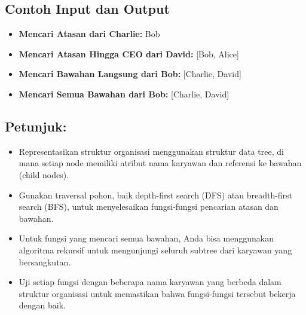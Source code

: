 \begin{center}
\end{center}


\subsection{Contoh Input dan Output}

\begin{itemize}
	\item \textbf{Mencari Atasan dari Charlie:} Bob
	\item \textbf{Mencari Atasan Hingga CEO dari David:} [Bob, Alice]
	\item \textbf{Mencari Bawahan Langsung dari Bob:} [Charlie, David]
	\item \textbf{Mencari Semua Bawahan dari Bob:} [Charlie, David]
\end{itemize}

\subsection{Petunjuk:}

\begin{itemize}
	\item Representasikan struktur organisasi menggunakan struktur data tree, di mana setiap node memiliki atribut nama karyawan dan referensi ke bawahan (child nodes).
	\item Gunakan traversal pohon, baik depth-first search (DFS) atau breadth-first search (BFS), untuk menyelesaikan fungsi-fungsi pencarian atasan dan bawahan.
	\item Untuk fungsi yang mencari semua bawahan, Anda bisa menggunakan algoritma rekursif untuk mengunjungi seluruh subtree dari karyawan yang bersangkutan.
	\item Uji setiap fungsi dengan beberapa nama karyawan yang berbeda dalam struktur organisasi untuk memastikan bahwa fungsi-fungsi tersebut bekerja dengan baik.
\end{itemize}

